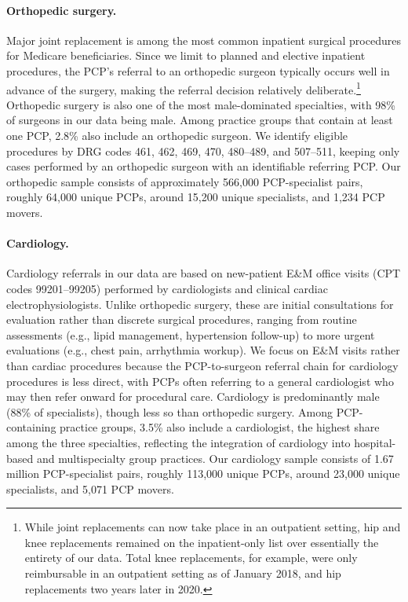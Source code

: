 \documentclass[12pt]{article}
\begin{document}
\paragraph{Orthopedic surgery.} Major joint replacement is among the most common inpatient surgical procedures for Medicare beneficiaries. Since we limit to planned and elective inpatient procedures, the PCP's referral to an orthopedic surgeon typically occurs well in advance of the surgery, making the referral decision relatively deliberate.\footnote{While joint replacements can now take place in an outpatient setting, hip and knee replacements remained on the inpatient-only list over essentially the entirety of our data. Total knee replacements, for example, were only reimbursable in an outpatient setting as of January 2018, and hip replacements two years later in 2020.} Orthopedic surgery is also one of the most male-dominated specialties, with 98\% of surgeons in our data being male. Among practice groups that contain at least one PCP, 2.8\% also include an orthopedic surgeon. We identify eligible procedures by DRG codes 461, 462, 469, 470, 480--489, and 507--511, keeping only cases performed by an orthopedic surgeon with an identifiable referring PCP. Our orthopedic sample consists of approximately 566,000 PCP-specialist pairs, roughly 64,000 unique PCPs, around 15,200 unique specialists, and 1,234 PCP movers.

\paragraph{Cardiology.} Cardiology referrals in our data are based on new-patient E\&M office visits (CPT codes 99201--99205) performed by cardiologists and clinical cardiac electrophysiologists. Unlike orthopedic surgery, these are initial consultations for evaluation rather than discrete surgical procedures, ranging from routine assessments (e.g., lipid management, hypertension follow-up) to more urgent evaluations (e.g., chest pain, arrhythmia workup). We focus on E\&M visits rather than cardiac procedures because the PCP-to-surgeon referral chain for cardiology procedures is less direct, with PCPs often referring to a general cardiologist who may then refer onward for procedural care. Cardiology is predominantly male (88\% of specialists), though less so than orthopedic surgery. Among PCP-containing practice groups, 3.5\% also include a cardiologist, the highest share among the three specialties, reflecting the integration of cardiology into hospital-based and multispecialty group practices. Our cardiology sample consists of 1.67 million PCP-specialist pairs, roughly 113,000 unique PCPs, around 23,000 unique specialists, and 5,071 PCP movers.
\end{document}
